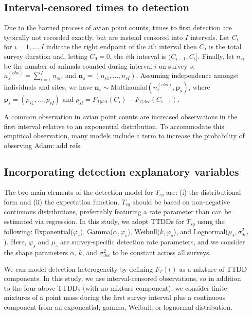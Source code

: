 \documentclass[useAMS,usenatbib,referee,12pt]{article}
\newcommand{\jarad}[1]{{\color{Orange} #1}}
\newcommand{\vn}{\textbf{n}}
\begin{document}
\subsection{Interval-censored times to detection}

Due to the harried process of avian point counts, times to first detection are typically not recorded exactly, but are instead censored into $I$ intervals. 
Let $C_i$ for $i=1,\dots,I$ indicate the right endpoint of the $i$th interval then $C_I$ is the total survey duration and, letting $C_0=0$, the $i$th interval is $(C_{i-1},C_{i}]$. 
Finally, let $n_{si}$ be the number of animals counted during interval $i$ on survey $s$, $n_{s}^{(obs)} = \sum_{i=1}^I n_{si}$, and $\vn_{s}=(n_{s1},\dots,n_{sI})$.
Assuming independence amongst individuals and sites, we have $\vn_{s} \sim \mbox{Multinomial}\left(n_{s}^{(obs)}, \textbf{p}_{s}\right)$, where $\textbf{p}_{s}=(p_{s1},\dots,p_{sI})$ and $p_{si} = F_{T|det}(C_i) - F_{T|det}(C_{i-1})$.  

A common observation in avian point counts are increased observations in the first interval relative to an exponential distribution.
To accommodate this empirical observation, many models include a term to increase the probability of observing 
\jarad{Adam: add refs.}



\subsection{Incorporating detection explanatory variables}\label{sec:detectionmodel}



The two main elements of the detection model for $T_{sq}$ are: (i) the distributional form and (ii) the expectation function.
$T_{sq}$ should be based on non-negative continuous distributions, preferrably featuring a rate parameter than can be estimated via regression.  
In this study, we adopt TTDDs for $T_{sq}$ using the following: Exponential($\varphi_{s}$), Gamma($\alpha, \varphi_{s}$), Weibull($k, \varphi_{s}$), and Lognormal($\mu_{s}, \sigma_{det}^2$).  
Here, $\varphi_{s}$ and $\mu_{s}$ are survey-specific detection rate parameters, and we consider the shape parameters $\alpha$, $k$, and $\sigma_{det}^2$ to be constant across all surveys.

We can model detection heterogeneity by defining $F_T(t)$ as a mixture of TTDD components.  
In this study, we use interval-censored observations, so in addition to the four above TTDDs (with no mixture component), we consider finite-mixtures of a point mass during the first survey interval plus a continuous component from an exponential, gamma, Weibull, or lognormal distribution.  
\end{document}
